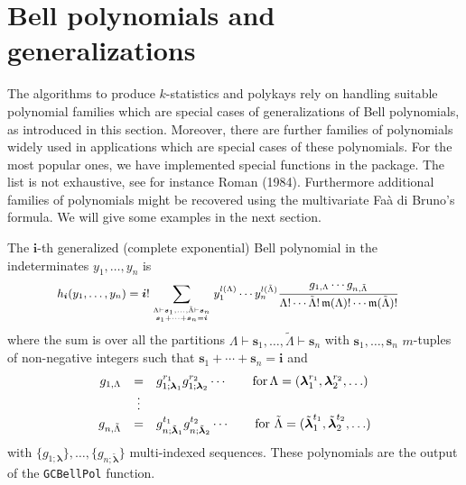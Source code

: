 \hypertarget{bell-polynomials-and-generalizations}{%
\section{Bell polynomials and generalizations}\label{bell-polynomials-and-generalizations}}

The algorithms to produce \(k\)-statistics and polykays rely on handling suitable polynomial families which are special cases of generalizations of Bell polynomials, as introduced in this section. Moreover, there are further families of polynomials widely used in applications which are special cases of these polynomials. For the most popular ones, we have implemented special functions in the  package. The list is not exhaustive, see for instance Roman (1984). Furthermore additional families of polynomials might be recovered using the multivariate Faà di Bruno's formula. We will give some examples in the next section.

The \(\boldsymbol{i}\)-th generalized (complete exponential) Bell polynomial in the indeterminates \(y_1, \ldots, y_n\) is
\begin{equation}
\hskip-0.5cm{\small h_{\boldsymbol{i}}(y_1, \ldots, y_n) = \boldsymbol{i}! \sum_{{\Lambda} \vdash \boldsymbol{s}_1, \ldots, \tilde{\Lambda} \vdash  \boldsymbol{s}_n \atop \boldsymbol{s}_1 + \cdots + \boldsymbol{s}_n = \boldsymbol{i}} y_1^{l(\Lambda)} \cdots y_n^{l(\tilde{\Lambda})} \frac{g_{1,\Lambda} \cdots g_{n,\tilde{\Lambda} }}{\Lambda!
\cdots \tilde{\Lambda}! \, \mathfrak{m}(\Lambda)! \cdots \mathfrak{m}(\tilde{\Lambda})!}}\!\!\!
\label{(sol22ter)}
\end{equation}
where the sum is over all the partitions \({\Lambda} \vdash \boldsymbol{s}_1, \ldots, \tilde{\Lambda} \vdash \boldsymbol{s}_n\) with \(\boldsymbol{s}_1,\ldots,\boldsymbol{s}_n\) \(m\)-tuples of non-negative integers such that \(\boldsymbol{s}_1 + \cdots + \boldsymbol{s}_n = \boldsymbol{i}\) and
\begin{equation}
\begin{array}{rcl}
g_{1,\Lambda} & = & g_{1; \boldsymbol{\lambda}_1}^{r_1} g_{1; \boldsymbol{\lambda}_2}^{r_2} \cdots \qquad \hbox{for}  \, \Lambda=(\boldsymbol{\lambda}_1^{r_1} , \boldsymbol{\lambda}_2^{r_2}, \ldots) \\
& \vdots & \\
g_{n,\tilde{\Lambda}} & = &  g_{n; \tilde{\boldsymbol{\lambda}}_1}^{t_1} g_{n; \tilde{\boldsymbol{\lambda}}_2}^{t_2} \cdots \qquad \hbox{for}  \,\, \tilde{\Lambda}=(\tilde{\boldsymbol{\lambda}}_1^{t_1} , \tilde{\boldsymbol{\lambda}}_2^{t_2}, \ldots)
\label{sequences}
\end{array}
\end{equation}
with \(\{ g_{1; \boldsymbol{\lambda}}\}, \ldots, \{ g_{n; \boldsymbol{\tilde{\lambda}}}\}\) multi-indexed sequences. These polynomials are the output of the \texttt{GCBellPol} function.

